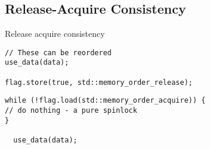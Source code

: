 \subsection{Release-Acquire Consistency}
Release acquire consistency
\\ \begin{minipage}{.49\textwidth}
\begin{verbatim}
// These can be reordered
use_data(data);

flag.store(true, std::memory_order_release);

  \end{verbatim}
\end{minipage}
\hfill
\begin{minipage}{.49\textwidth}
  \begin{verbatim}
while (!flag.load(std::memory_order_acquire)) {
// do nothing - a pure spinlock
}

  use_data(data);
  \end{verbatim}
\end{minipage}
\unfinished